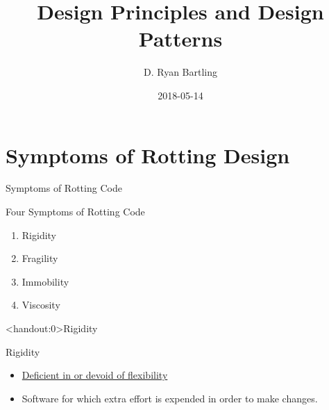 \documentclass[xcolor=svgnames]{beamer}
\title
    [Design Principles\hspace{2em}]
    {Design Principles and Design Patterns}
\author
    [Ryan Bartling]
    {D. Ryan Bartling}
\date
{2018-05-14}
\begin{document}
\maketitle

\section{Symptoms of Rotting Design}


\begin{frame}
    {Symptoms of Rotting Code}

    Four Symptoms of Rotting Code\pause

    \begin{enumerate}
        \item Rigidity\pause
        \item Fragility\pause
        \item Immobility\pause
        \item Viscosity\pause
    \end{enumerate}
\end{frame}


{%
%
\begin{frame}<handout:0>{Rigidity}
\end{frame}
}

{%
%
\begin{frame}{Rigidity}

    \begin{itemize}
        \item \href{https://www.merriam-webster.com/dictionary/rigid}
            {Deficient in or devoid of flexibility}
        \item<2-> Software for which extra effort is expended in order to make
            changes.
    \end{itemize}
\end{frame}
}

\end{document}
